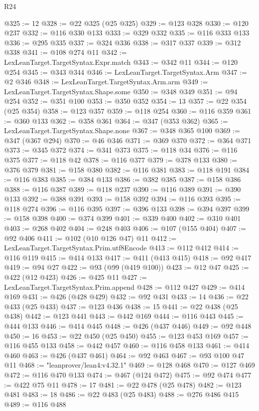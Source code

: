 \begin{lexlean}{R24}
\begin{coremodule}
{{{{{{{{{{{{{{{{{{{{{{{{{{{{{{{{{{{{{{{{{{{{{{{{{{{{{{{{{{{{{{{{{{{{{{{{{{{{{{{{{{{{{{{{{{{{{{{{{{{{{{{{{{{{{{{{{{{{{{{{{{{{{{{{{{{{{{{{{{{{{{{{{{{{{{{{{{{{{{{{{{{{{{{{{{{{{{{{{{{{{{{{{{{{{{{{{{{@325 := 12
@328 := @22 @325 (@25 @325)
@329 := @123 @328
@330 := @120 @237
@332 := @116 @330 @133
@333 := @329 @332
@335 := @116 @333 @133
@336 := @295 @335
@337 := @324 @336
@338 := @317 @337
@339 := @312 @338
@341 := @108 @274 @11
@342 := LexLeanTarget.TargetSyntax.Expr.match
@343 := @342 @11
@344 := @120 @254
@345 := @343 @344
@346 := LexLeanTarget.TargetSyntax.Arm
@347 := @2 @346
@348 := LexLeanTarget.TargetSyntax.Arm.arm
@349 := LexLeanTarget.TargetSyntax.Shape.some
@350 := @348 @349
@351 := @94 @254
@352 := @351 @100
@353 := @350 @352
@354 := 13
@357 := @22 @354 (@25 @354)
@358 := @123 @357
@359 := @118 @254
@360 := @116 @359
@361 := @360 @133
@362 := @358 @361
@364 := @347 (@353 @362)
@365 := LexLeanTarget.TargetSyntax.Shape.none
@367 := @348 @365 @100
@369 := @347 (@367 @294)
@370 := @46 @346
@371 := @369 @370
@372 := @364 @371
@373 := @345 @372
@374 := @341 @373
@375 := @118 @34
@376 := @116 @375
@377 := @118 @42
@378 := @116 @377
@379 := @378 @133
@380 := @376 @379
@381 := @158 @380
@382 := @116 @381
@383 := @118 @191
@384 := @116 @383
@385 := @384 @133
@386 := @382 @385
@387 := @158 @386
@388 := @116 @387
@389 := @118 @237
@390 := @116 @389
@391 := @390 @133
@392 := @388 @391
@393 := @158 @392
@394 := @116 @393
@395 := @118 @274
@396 := @116 @395
@397 := @396 @133
@398 := @394 @397
@399 := @158 @398
@400 := @374 @399
@401 := @339 @400
@402 := @310 @401
@403 := @268 @402
@404 := @248 @403
@406 := @107 (@155 @404)
@407 := @92 @406
@411 := @102 (@10 @126 @47) @11
@412 := LexLeanTarget.TargetSyntax.Prim.utf8Encode
@413 := @112 @412
@414 := @116 @119
@415 := @414 @133
@417 := @411 (@413 @415)
@418 := @92 @417
@419 := @94 @27
@422 := @93 (@99 (@419 @100))
@423 := @12 @47
@425 := @422 (@12 @423)
@426 := @425 @11
@427 := LexLeanTarget.TargetSyntax.Prim.append
@428 := @112 @427
@429 := @414 @169
@431 := @426 (@428 @429)
@432 := @92 @431
@433 := 14
@436 := @22 @433 (@25 @433)
@437 := @123 @436
@438 := 15
@441 := @22 @438 (@25 @438)
@442 := @123 @441
@443 := @442 @169
@444 := @116 @443
@445 := @444 @133
@446 := @414 @445
@448 := @426 (@437 @446)
@449 := @92 @448
@450 := 16
@453 := @22 @450 (@25 @450)
@455 := @123 @453 @169
@457 := @116 @455 @133
@458 := @442 @457
@460 := @116 @458 @133
@461 := @414 @460
@463 := @426 (@437 @461)
@464 := @92 @463
@467 := @93 @100 @47 @11
@468 := "leanprover/lean4:v4.32.1"
@469 := @128 @468
@470 := @127 @469
@472 := @116 @470 @133
@474 := @467 (@124 @472)
@475 := @92 @474
@477 := @422 @75 @11
@478 := 17
@481 := @22 @478 (@25 @478)
@482 := @123 @481
@483 := 18
@486 := @22 @483 (@25 @483)
@488 := @276 @486 @415
@489 := @116 @488
}}}}}}}}}}}}}}}}}}}}}}}}}}}}}}}}}}}}}}}}}}}}}}}}}}}}}}}}}}}}}}}}}}}}}}}}}}}}}}}}}}}}}}}}}}}}}}}}}}}}}}}}}}}}}}}}}}}}}}}}}}}}}}}}}}}}}}}}}}}}}}}}}}}}}}}}}}}}}}}}}}}}}}}}}}}}}}}}}}}}}}}}}}}}}}}}}}}
\end{coremodule}
\end{lexlean}
